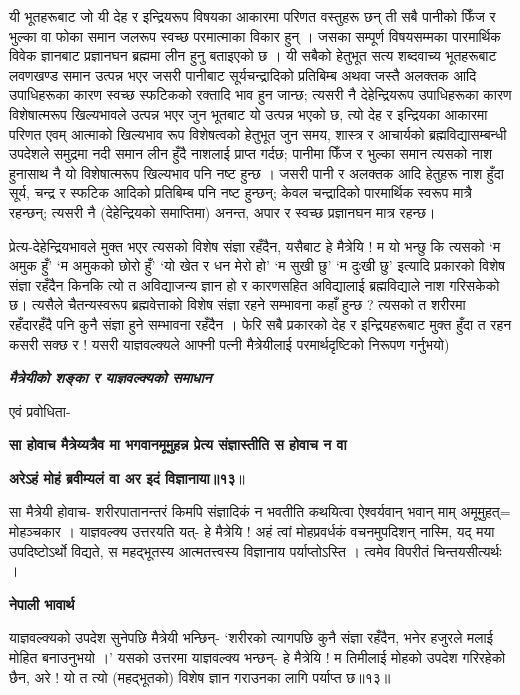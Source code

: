 \documentclass[11pt, a5paper]{article}
\begin{document}
यी भूतहरूबाट जो यी देह र इन्द्रियरूप विषयका आकारमा परिणत वस्तुहरू छन् ती सबै पानीको फिँज र भुल्का वा फोका समान जलरूप स्वच्छ परमात्माका विकार हुन् । जसका सम्पूर्ण विषयसम्मका पारमार्थिक विवेक ज्ञानबाट प्रज्ञानघन ब्रह्ममा लीन हुनु बताइएको छ । यी सबैको हेतुभूत सत्य शब्दवाच्य भूतहरूबाट लवणखण्ड समान उत्पन्न भएर जसरी पानीबाट सूर्यचन्द्रादिको प्रतिबिम्ब अथवा जस्तै अलक्तक आदि उपाधिहरूका कारण स्वच्छ स्फटिकको रक्तादि भाव हुन जान्छ; त्यसरी नै देहेन्द्रियरूप उपाधिहरूका कारण विशेषात्मरूप खिल्यभावले उत्पन्न भएर जुन भूतबाट यो उत्पन्न भएको छ, त्यो देह र इन्द्रियका आकारमा परिणत एवम् आत्माको खिल्यभाव रूप विशेषत्वको हेतुभूत जुन समय, शास्त्र र आचार्यको ब्रह्मविद्यासम्बन्धी उपदेशले समुद्रमा नदी समान लीन हुँदै नाशलाई प्राप्त गर्दछ; पानीमा फिँज र भुल्का समान त्यसको नाश हुनासाथ नै यो विशेषात्मरूप खिल्यभाव पनि नष्ट हुन्छ । जसरी पानी र अलक्तक आदि हेतुहरू नाश हुँदा सूर्य, चन्द्र र स्फटिक आदिको प्रतिबिम्ब पनि नष्ट हुन्छन्; केवल चन्द्रादिको पारमार्थिक स्वरूप मात्रै रहन्छन्; त्यसरी नै (देहेन्द्रियको समाप्तिमा) अनन्त, अपार र स्वच्छ प्रज्ञानघन मात्र रहन्छ।

प्रेत्य-देहेन्द्रियभावले मुक्त भएर त्यसको विशेष संज्ञा रहँदैन, यसैबाट हे मैत्रेयि ! म यो भन्छु कि त्यसको ‘म अमुक  हुँ’ ‘म अमुकको छोरो हुँ’ ‘यो खेत र धन मेरो हो’ ‘म सुखी छु’ ‘म दुःखी छु’ इत्यादि प्रकारको विशेष संज्ञा रहँदैन किनकि त्यो त अविद्याजन्य ज्ञान हो र कारणसहित अविद्यालाई ब्रह्मविद्याले नाश गरिसकेको छ।  त्यसैले चैतन्यस्वरूप ब्रह्मवेत्ताको विशेष संज्ञा रहने सम्भावना कहाँ हुन्छ ? त्यसको त शरीरमा रहँदारहँदै पनि कुनै संज्ञा हुने सम्भावना रहँदैन । फेरि सबै प्रकारको देह र इन्द्रियहरूबाट मुक्त हुँदा त रहन कसरी सक्छ र !  यसरी याज्ञवल्क्यले आफ्नी पत्नी मैत्रेयीलाई परमार्थदृष्टिको निरूपण गर्नुभयो)

\textit{\textbf{मैत्रेयीको शङ्का र याज्ञवल्क्यको समाधान}}

एवं प्रवोधिता-

\textbf{सा होवाच मैत्रेय्यत्रैव मा भगवानमूमुहन्न प्रेत्य संज्ञास्तीति स होवाच न वा}

\textbf{अरेऽहं मोहं ब्रवीम्यलं वा अर इदं विज्ञानाया॥१३}॥

सा मैत्रेयी होवाच- शरीरपातानन्तरं किमपि संज्ञादिकं न भवतीति कथयित्वा ऐश्वर्यवान् भवान् माम् अमूमुहत्= मोहञ्चकार । याज्ञवल्क्य उत्तरयति यत्- हे मैत्रेयि ! अहं त्वां मोहप्रवर्धकं वचनमुपदिशन् नास्मि, यद् मया उपदिष्टोऽर्थो विद्यते, स  महद्‌भूतस्य आत्मतत्त्वस्य विज्ञानाय पर्याप्तोऽस्ति । त्वमेव विपरीतं चिन्तयसीत्यर्थः ।

\textbf{नेपाली भावार्थ}

याज्ञवल्क्यको उपदेश सुनेपछि मैत्रेयी भन्छिन्- ‘शरीरको त्यागपछि कुनै संज्ञा रहँदैन, भनेर हजुरले मलाई मोहित बनाउनुभयो ।’ यसको उत्तरमा याज्ञवल्क्य भन्छन्- हे मैत्रेयि ! म तिमीलाई मोहको उपदेश गरिरहेको छैन, अरे ! यो त त्यो (महद्‍भूतको) विशेष ज्ञान गराउनका लागि पर्याप्त छ॥१३॥
\end{document}
